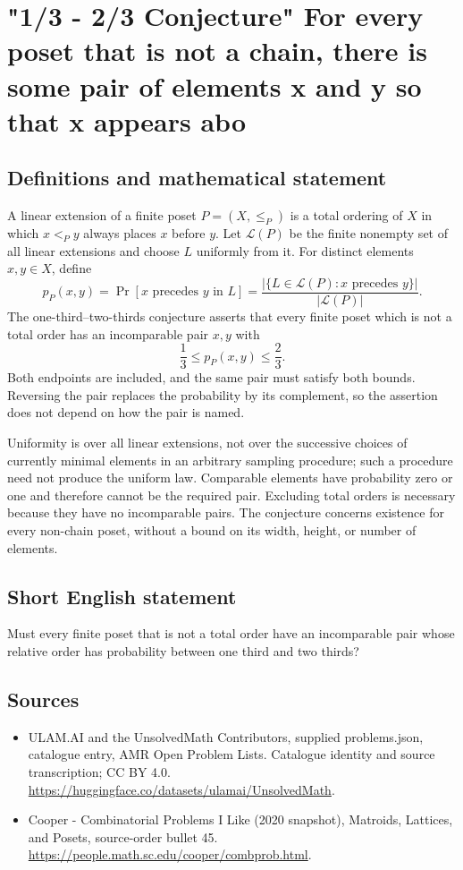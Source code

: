 \documentclass[11pt,a4paper]{article}
\begin{document}
\section*{"1/3 - 2/3 Conjecture" For every poset that is not a chain, there is some pair of elements x and y so that x appears abo}\label{statement}

\subsection{Definitions and mathematical statement}
A linear extension of a finite poset $P=(X,\le_P)$ is a total
ordering of $X$ in which $x<_P y$ always places $x$ before $y$.
Let $\mathcal L(P)$ be the finite nonempty set of all linear
extensions and choose $L$ uniformly from it. For distinct
elements $x,y\in X$, define
\[
 p_P(x,y)=\Pr[x\text{ precedes }y\text{ in }L]
        =\frac{|\{L\in\mathcal L(P):x\text{ precedes }y\}|}
                    {|\mathcal L(P)|}.
\]
The one-third--two-thirds conjecture asserts that every finite
poset which is not a total order has an incomparable pair $x,y$
with
\[
                       \frac13\le p_P(x,y)\le\frac23.
\]
Both endpoints are included, and the same pair must satisfy both
bounds. Reversing the pair replaces the probability by its
complement, so the assertion does not depend on how the pair is
named.

Uniformity is over all linear extensions, not over the successive
choices of currently minimal elements in an arbitrary sampling
procedure; such a procedure need not produce the uniform law.
Comparable elements have probability zero or one and therefore
cannot be the required pair. Excluding total orders is necessary
because they have no incomparable pairs. The conjecture concerns
existence for every non-chain poset, without a bound on its width,
height, or number of elements.
\subsection{Short English statement}
Must every finite poset that is not a total order have an incomparable pair whose relative order has probability between one third and two thirds?
\subsection{Sources}
\begin{itemize}
\item[S1] ULAM.AI and the UnsolvedMath Contributors, supplied problems.json, catalogue entry, AMR Open Problem Lists. Catalogue identity and source transcription; CC BY 4.0.
\url{https://huggingface.co/datasets/ulamai/UnsolvedMath}.
\item[S2] Cooper - Combinatorial Problems I Like (2020 snapshot), Matroids, Lattices, and Posets, source-order bullet 45. 
\url{https://people.math.sc.edu/cooper/combprob.html}.
\end{itemize}
\end{document}
